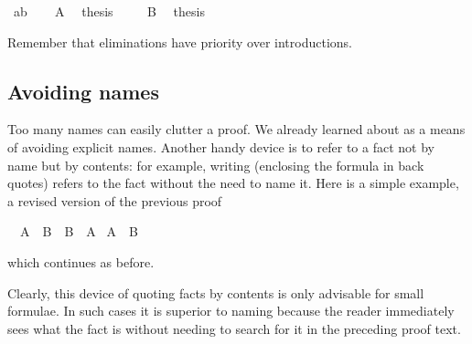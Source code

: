 \begin{isabellebody}
\isamarkupfalse%
\ ab\isanewline
{}\isamarkupfalse%
\isanewline
\ \ \isamarkupfalse%
\ A\ \isamarkupfalse%
\ {}thesis\ \isamarkupfalse%
\isanewline
{}\isamarkupfalse%
\isanewline
\ \ \isamarkupfalse%
\ B\ \isamarkupfalse%
\ {}thesis\ \isamarkupfalse%
\isanewline
{}\isamarkupfalse%
%
\endisatagproof
{\isafoldproof}%
%
\isadelimproof
%
\endisadelimproof
%
\begin{isamarkuptext}%
\noindent Remember that eliminations have priority over
introductions.

\subsection{Avoiding names}

Too many names can easily clutter a proof.  We already learned
about  as a means of avoiding explicit names. Another
handy device is to refer to a fact not by name but by contents: for
example, writing  (enclosing the formula in back quotes)
refers to the fact 
without the need to name it. Here is a simple example, a revised version
of the previous proof%
\end{isamarkuptext}%
\isamarkuptrue%
\isamarkupfalse%
\ \ {}A\ {}\ B{}\ \ {}B\ {}\ A{}\isanewline
%
\isadelimproof
%
\endisadelimproof
%
\isatagproof
{}\isamarkupfalse%
\ {}A\ {}\ B{}%
\endisatagproof
{\isafoldproof}%
%
\isadelimproof
%
\endisadelimproof
%
\begin{isamarkuptext}%
\noindent which continues as before.

Clearly, this device of quoting facts by contents is only advisable
for small formulae. In such cases it is superior to naming because the
reader immediately sees what the fact is without needing to search for
it in the preceding proof text.


\end{isamarkuptext}
\end{isabellebody}
